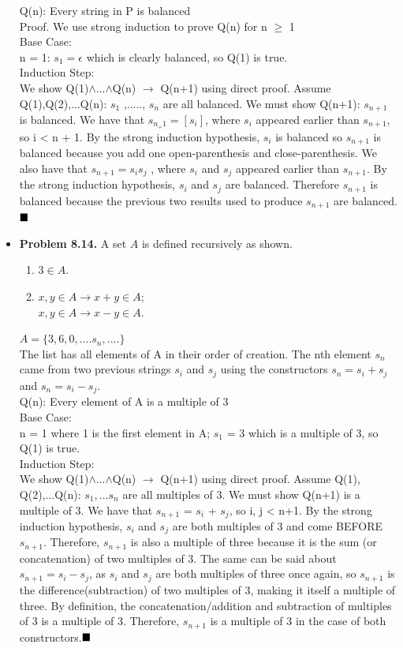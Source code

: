 \documentclass{article}
\begin{document}
\begin{itemize}
Q(n): Every string in P is balanced\\
Proof. We use strong induction to prove Q(n) for n $\ge$ 1\\
Base Case: \\
n = 1: $s_1 = \epsilon$ which is clearly balanced, so Q(1) is true.\\
Induction Step:\\
    We show Q(1)$\wedge$...$\wedge$Q(n) $\rightarrow$ Q(n+1) using direct proof. Assume Q(1),Q(2),...Q(n): 
$s_1$ ,....., $s_n$ are all balanced. We must show Q(n+1): $s_{n+1}$ is balanced. We have that $s_{n_+1} = [s_i]$, where $s_i$ appeared earlier than $s_{n+1}$, so i < n + 1. By the strong induction hypothesis, $s_i$ is balanced so $s_{n+1}$ is balanced because you add one open-parenthesis and close-parenthesis. We also have that $s_{n+1} = s_is_j$ , where $s_i$ and $s_j$ appeared earlier than $s_{n+1}$. By the strong induction hypothesis, $s_i$ and $s_j$ are balanced. Therefore $s_{n+1}$ is balanced because the previous two results used to produce $s_{n+1}$ are balanced.$\hfill\blacksquare$\\


        \item \textbf{Problem 8.14.} A set $A$ is defined recursively as shown.
        \begin{enumerate}[label=\arabic*.]
            \item $3 \in A$.
            \item $x,y \in A \rightarrow x + y \in A$;\\
            $x,y \in A \rightarrow x-y \in A$.
        \end{enumerate}
       $A = \{3, 6, 0,....s_n,....\}$\\
The list has all elements of A in their order of creation. The nth element $s_n$ came from two previous strings $s_i$ and $s_j$ using the constructors $s_n = s_i + s_j$ and $s_n = s_i - s_j$.\\
Q(n): Every element of A is a multiple of 3\\
Base Case: \\
    n = 1 where 1 is the first element in A; $s_1$ = 3 which is a multiple of 3, so Q(1) is true. \\
Induction Step: \\
    We show Q(1)$\wedge$...$\wedge$Q(n) $\rightarrow$ Q(n+1) using direct proof. Assume Q(1), Q(2),...Q(n): $s_1,...s_n$ are all multiples of 3. We must show Q(n+1) is a multiple of 3. We have that $s_{n+1}$ = $s_i$ + $s_j$, so i, j < n+1.  By the strong induction hypothesis, $s_i$ and $s_j$ are both multiples of 3 and come BEFORE $s_{n+1}$. Therefore, $s_{n+1}$ is also a multiple of three because it is the sum (or concatenation) of two multiples of 3. The same can be said about $s_{n+1} = s_i - s_j$, as $s_i$ and $s_j$ are both multiples of three once again, so $s_{n+1}$ is the difference(subtraction) of two multiples of 3, making it itself a multiple of three. By definition, the concatenation/addition and subtraction of multiples of 3 is a multiple of 3. Therefore, $s_{n+1}$ is a multiple of 3 in the case of both constructors.$\hfill\blacksquare$\\



\end{itemize}
\end{document}
